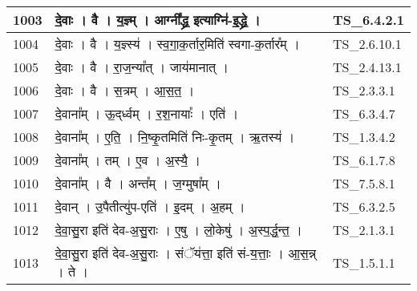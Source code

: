\documentclass[17pt]{extarticle}
\begin{document}
\begin{longtable}{||p{0.4in}||p{4.9in}||p{0.9in}||}
    \hline
        
    1003 & दे॒वाः   ।   वै   ।   य॒ज्ञ्म्   ।   आग्नी᳚द्ध्र॒ इत्याग्नि॑{-}इ॒द्ध्रे॒   ।    & TS\_6.4.2.1       \\
    
    \hline
        
    1004 & दे॒वाः   ।   वै   ।   य॒ज्ञ्स्य॑   ।   स्व॒गा॒क॒र्तार॒मिति॑ स्वगा{-}क॒र्तार᳚म्   ।    & TS\_2.6.10.1       \\
    
    \hline
        
    1005 & दे॒वाः   ।   वै   ।   रा॒ज॒न्या᳚त्   ।   जाय॑मानात्   ।    & TS\_2.4.13.1       \\
    
    \hline
        
    1006 & दे॒वाः   ।   वै   ।   स॒त्रम्   ।   आ॒स॒त॒   ।    & TS\_2.3.3.1       \\
    
    \hline
        
    1007 & दे॒वाना᳚म्   ।   ऊ॒द्‌र्ध्वम्   ।   र॒श॒नायाः᳚   ।   एति॑   ।    & TS\_6.3.4.7       \\
    
    \hline
        
    1008 & दे॒वाना᳚म्   ।   ए॒ति॒   ।   नि॒ष्कृ॒तमिति॑ निः{-}कृ॒तम्   ।   ऋ॒तस्य॑   ।    & TS\_1.3.4.2       \\
    
    \hline
        
    1009 & दे॒वाना᳚म्   ।   तम्   ।   ए॒व   ।   अ॒स्यै॒   ।    & TS\_6.1.7.8       \\
    
    \hline
        
    1010 & दे॒वाना᳚म्   ।   वै   ।   अन्त᳚म्   ।   ज॒ग्मुषा᳚म्   ।    & TS\_7.5.8.1       \\
    
    \hline
        
    1011 & दे॒वान्   ।   उ॒पैतीत्यु॑प{-}एति॑   ।   इ॒दम्   ।   अ॒हम्   ।    & TS\_6.3.2.5       \\
    
    \hline
        
    1012 & दे॒वा॒सु॒रा इति॑ देव{-}अ॒सु॒राः   ।   ए॒षु   ।   लो॒केषु॑   ।   अ॒स्प॒र्द्ध॒न्त॒   ।    & TS\_2.1.3.1       \\
    
    \hline
        
    1013 & दे॒वा॒सु॒रा इति॑ देव{-}अ॒सु॒राः   ।   संॅय॑त्ता॒ इति॑ सं{-}य॒त्ताः॒   ।   आ॒स॒न्न्   ।   ते   ।    & TS\_1.5.1.1       \\
    

\end{longtable}
\end{document}
